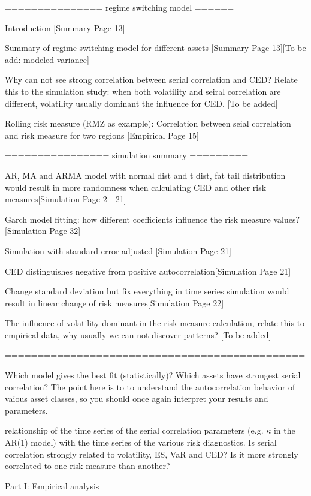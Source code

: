 \documentclass[11pt]{article}
\begin{document}
=============== regime switching model ======

Introduction [Summary Page 13]

Summary of regime switching model for different assets [Summary Page 13][To be add: modeled variance]

Why can not see strong correlation between serial correlation and CED? Relate this to the simulation study: when both volatility and seiral correlation are different, volatility usually dominant the influence for CED. [To be added]

Rolling risk measure (RMZ as example): Correlation between seial correlation and risk measure for two regions [Empirical Page 15]

================ simulation summary =========

AR, MA and ARMA model with normal dist and t dist, fat tail distribution would result in more randomness when calculating CED and other risk measures[Simulation Page 2 - 21]

Garch model fitting: how different coefficients influence the risk measure values? [Simulation Page 32]

Simulation with standard error adjusted [Simulation Page 21]

CED distinguishes negative from positive autocorrelation[Simulation Page 21]

Change standard deviation but fix everything in time series simulation would result in linear change of risk measures[Simulation Page 22]

The influence of volatility dominant in the risk measure calculation, relate this to empirical data, why usually we can not discover patterns? [To be added] 

==============================================

Which model gives the best fit (statistically)? Which assets have strongest serial correlation? The point here is to to understand the autocorrelation behavior of vaious asset classes, so you should once again interpret your results and parameters.

relationship of the time series of the serial correlation parameters (e.g. $\kappa$ in the AR(1) model) with the time series of the various risk diagnostics. Is serial correlation strongly related to volatility, ES, VaR and CED? Is it more strongly correlated to one risk measure than another?



Part I: Empirical analysis
\end{document}
